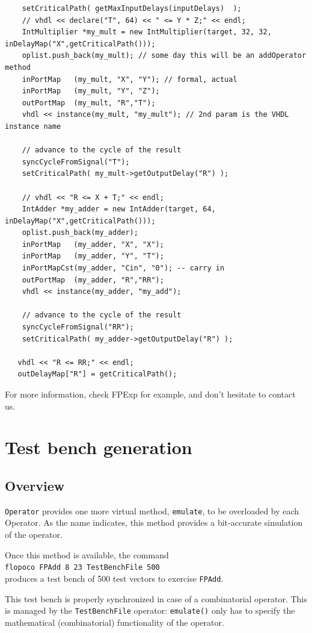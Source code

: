 \documentclass{article}
\begin{document}
\begin{verbatim}
	setCriticalPath( getMaxInputDelays(inputDelays)  );
	// vhdl << declare("T", 64) << " <= Y * Z;" << endl;
	IntMultiplier *my_mult = new IntMultiplier(target, 32, 32, inDelayMap("X",getCriticalPath()));
	oplist.push_back(my_mult); // some day this will be an addOperator method
	inPortMap   (my_mult, "X", "Y"); // formal, actual
	inPortMap   (my_mult, "Y", "Z");
	outPortMap  (my_mult, "R","T");
	vhdl << instance(my_mult, "my_mult"); // 2nd param is the VHDL instance name

	// advance to the cycle of the result
	syncCycleFromSignal("T"); 
	setCriticalPath( my_mult->getOutputDelay("R") );
	
	// vhdl << "R <= X + T;" << endl;
	IntAdder *my_adder = new IntAdder(target, 64, inDelayMap("X",getCriticalPath()));
	oplist.push_back(my_adder);
	inPortMap   (my_adder, "X", "X");
	inPortMap   (my_adder, "Y", "T");
	inPortMapCst(my_adder, "Cin", "0"); -- carry in
	outPortMap  (my_adder, "R","RR");
	vhdl << instance(my_adder, "my_add");

	// advance to the cycle of the result
	syncCycleFromSignal("RR"); 
	setCriticalPath( my_adder->getOutputDelay("R") );
	
   vhdl << "R <= RR;" << endl; 
   outDelayMap["R"] = getCriticalPath();
\end{verbatim}

For more information, check FPExp for example, and
don't hesitate to contact us.


\section{Test bench generation}\label{sec:test-bench-gener}

\subsection{Overview}
\texttt{\small Operator} provides one more virtual method, \texttt{\small emulate},
to be overloaded by each Operator. As the name indicates, this method
provides a bit-accurate simulation of the operator.
 
Once this method is available, the command\\
 \texttt{flopoco FPAdd 8 23 TestBenchFile 500} \\
produces a test bench of 500 test vectors to exercise \texttt{\small FPAdd}. 

This test bench is properly synchronized in case of a combinatorial
operator. This is managed by the \texttt{\small TestBenchFile} operator:
\texttt{\small emulate()} only has to specify the mathematical
(combinatorial) functionality of the operator.
\end{document}
